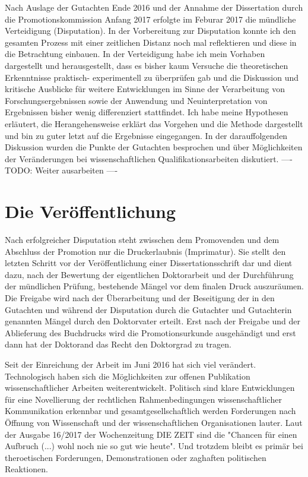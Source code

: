 Nach Auslage der Gutachten Ende 2016 und der Annahme der Dissertation durch die Promotionskommission Anfang 2017 erfolgte im Feburar 2017 die mündliche Verteidigung (Disputation). In der Vorbereitung zur Disputation konnte ich den gesamten Prozess mit einer zeitlichen Distanz noch mal reflektieren und diese in die Betrachtung einbauen. In der Verteidigung habe ich mein Vorhaben dargestellt und herausgestellt, dass es bisher kaum Versuche die theoretischen Erkenntnisse praktisch- experimentell zu überprüfen gab und die Diskussion und kritische Ausblicke für weitere Entwicklungen im Sinne der Verarbeitung von Forschungsergebnissen sowie der Anwendung und Neuinterpretation von Ergebnissen bisher wenig differenziert stattfindet. Ich habe meine Hypothesen erläutert, die Herangehensweise erklärt das Vorgehen und die Methode dargestellt und bin zu guter letzt auf die Ergebnisse eingegangen. In der darauffolgenden Diskussion wurden die Punkte der Gutachten besprochen und über Möglichkeiten der Veränderungen bei wissenschaftlichen Qualifikationsarbeiten diskutiert. ---- TODO: Weiter ausarbeiten ----

\section{Die Veröffentlichung}

Nach erfolgreicher Disputation steht zwisschen dem Promovenden und dem Abschluss der Promotion nur die Druckerlaubnis (Imprimatur). Sie stellt den letzten Schritt vor der Veröffentlichung einer Dissertationsschrift dar und dient dazu, nach der Bewertung der eigentlichen Doktorarbeit und der Durchführung der mündlichen Prüfung, bestehende Mängel vor dem finalen Druck auszuräumen. Die Freigabe wird nach der Überarbeitung und der Beseitigung der in den Gutachten und während der Disputation durch die Gutachter und Gutachterin genannten Mängel durch den Doktorvater erteilt. Erst nach der Freigabe und der Ablieferung des Buchdrucks wird die Promotionsurkunde ausgehändigt und erst dann hat der Doktorand das Recht den Doktorgrad zu tragen.

Seit der Einreichung der Arbeit im Juni 2016 hat sich viel verändert. Technologisch haben sich die Möglichkeiten zur offenen Publikation wissenschaftlicher Arbeiten weiterentwickelt. Politisch sind klare Entwicklungen für eine Novellierung der rechtlichen Rahmenbedingungen wissenschaftlicher Kommunikation erkennbar und gesamtgesellschaftlich werden Forderungen nach Öffnung von Wissenschaft und der wissenschaftlichen Organisationen lauter. Laut der Ausgabe 16/2017 der Wochenzeitung DIE ZEIT sind die "Chancen für einen Aufbruch (...) wohl noch nie so gut wie heute". Und trotzdem bleibt es primär bei theroetischen Forderungen, Demonstrationen oder zaghaften politischen Reaktionen.

